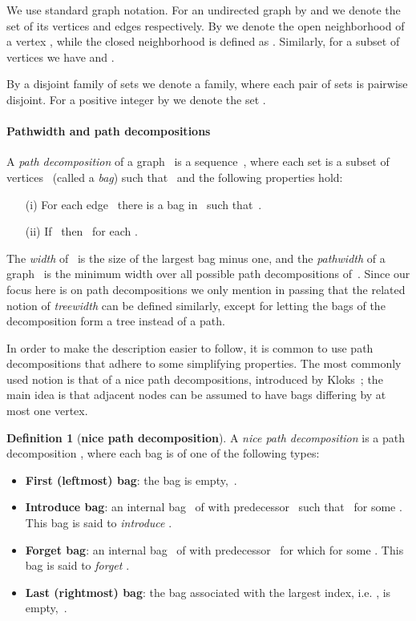 \documentclass[11pt]{article}
\theoremstyle{definition}
\newtheorem{definition}[theorem]{Definition}
\begin{document}
We use standard graph notation. For an undirected graph  by  and 
we denote the set of its vertices and edges respectively. By 
we denote the open neighborhood of a vertex , while the closed neighborhood is defined as .
Similarly, for a subset of vertices  we have  and .

By a disjoint family of sets we denote a family, where each pair of sets is pairwise disjoint.
For a positive integer  by  we denote the set .

\paragraph{Pathwidth and path decompositions} A \emph{path decomposition} of a graph~ is a sequence~, where each
set  is a subset of vertices~ (called a \emph{bag}) such that~ and the following properties hold:
\begin{itemize}
\item[(i)] For each edge~ there is a bag  in~ such that~.
\item[(ii)] If~ then~ for each .
\end{itemize}

The \emph{width} of~ is the size of the largest bag minus one, and the {\em pathwidth} of a graph~ is the minimum width over all possible path decompositions of~. Since our focus here is on path decompositions we only mention in passing that the related notion of \emph{treewidth} can be defined similarly, except for letting the bags of the decomposition form a tree instead of a path.

In order to make the description easier to follow,
it is common to use path decompositions that adhere to some simplifying properties.
The most commonly used notion is that of a nice path decompositions, introduced by Kloks~\cite{Kloks94}; the main idea is that adjacent nodes can be assumed to have bags differing by at most one vertex. 

\begin{definition}[{\bf nice path decomposition}] \label{def:nicepathdecomp}
A \emph{nice path decomposition} is a path decomposition , where each bag is of one of the following types:
\begin{itemize}
\item \textbf{First (leftmost) bag}: the bag  is empty,~.
\item \textbf{Introduce bag}: an internal bag~ of  with predecessor~ such that~ for some . 
This bag is said to \emph{introduce} .
\item \textbf{Forget bag}: an internal bag~ of  with predecessor~ for which  for some . This bag is said to \emph{forget} .
\item \textbf{Last (rightmost) bag}: the bag associated with the largest index, i.e. , is empty,~.
\end{itemize}
\end{definition}
\end{document}
